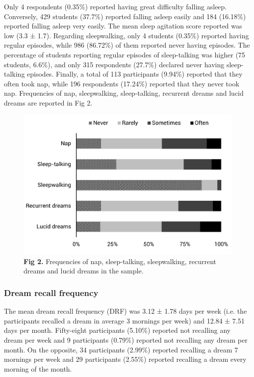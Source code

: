 Only 4 respondents (0.35\%) reported having great difficulty falling asleep. Conversely, 429 students (37.7\%) reported falling asleep easily and 184 (16.18\%) reported falling asleep very easily. The mean sleep agitation score reported was low (3.3 ± 1.7). Regarding sleepwalking, only 4 students (0.35\%) reported having regular episodes, while 986 (86.72\%) of them reported never having episodes. The percentage of students reporting regular episodes of sleep-talking was higher (75 students, 6.6\%), and only 315 respondents (27.7\%) declared never having sleep-talking episodes. Finally, a total of 113 participants (9.94\%) reported that they often took nap, while 196 respondents (17.24\%) reported that they never took nap. Frequencies of nap, sleepwalking, sleep-talking, recurrent dreams and lucid dreams are reported in Fig 2.

\begin{figure}[htbp]
	\includegraphics[width=\textwidth]{Fig/Results/Survey/Fig2.png}
	\caption*{\textbf{Fig 2.} Frequencies of nap, sleep-talking, sleepwalking, recurrent dreams and lucid dreams in the sample.}
\end{figure}

\subsubsection*{Dream recall frequency}
The mean dream recall frequency (DRF) was 3.12 ± 1.78 days per week (i.e. the participants recalled a dream in average 3 mornings per week) and 12.84 ± 7.51 days per month. Fifty-eight participants (5.10\%) reported not recalling any dream per week and 9 participants (0.79\%) reported not recalling any dream per month. On the opposite, 34 participants (2.99\%) reported recalling a dream 7 mornings per week and 29 participants (2.55\%) reported recalling a dream every morning of the month.

